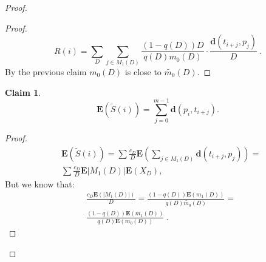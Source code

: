 \documentclass[11pt]{article}
\newtheorem{claim}{Claim}[section]
\newcommand{\envert}[1]{\left\lvert#1\right\rvert}
\let\abs=\envert
\newcommand{\bfE}{\textbf{E}}
\newcommand{\dist}{\textbf{d}}
\begin{document}
\begin{proof}
\begin{proof}
 \[
 R(i)=\sum_D{\sum_{j\in
M_1(D)}\frac{(1-q(D))D}{q(D)m_0(D)}\cdot\frac{ \dist(t_{i+j},p_j)
}{D}}\ .\]
By the previous claim $m_0(D)$  is close to $\tilde{m_0}(D)$.
\end{proof}
\begin{claim}\label{expectation}
\[
\bfE(\tilde{S}(i))=\sum_{j=0}^{m-1} \dist(p_i,t_{i+j}) .
\]
\end{claim}
\begin{proof}
\begin{equation}
\begin{split}
&\bfE(\tilde{S}(i))=\sum \frac{c_D}{D}\bfE(\sum_{j\in
M_1(D)}\dist(t_{i+j},p_j))=\\
&\sum \frac{c_D}{D}\bfE\abs{M_1(D)}\bfE(X_D) ,
\end{split}
\end{equation}
 But we know that:
\begin{equation}
\begin{split}
&\frac{c_D\bfE(\abs{M_1(D)})}{D}=\frac{(1-q(D))\bfE(m_1(D))}{q(D)\tilde{m_0}(D)}=\\
&\frac{(1-q(D))\bfE(m_1(D))}{q(D)\bfE({m_0}(D))}\ .
\end{split}
\end{equation}


\end{proof}
\end{proof}
\end{document}
